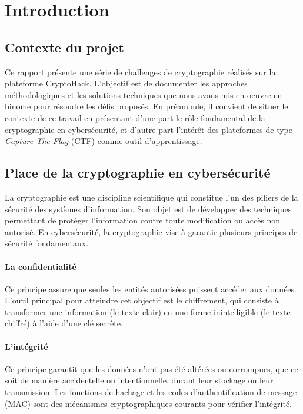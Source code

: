 \section{Introduction}

\subsection{Contexte du projet}
Ce rapport présente une série de challenges de cryptographie réalisés sur la
plateforme CryptoHack. L'objectif est de documenter les approches
méthodologiques et les solutions techniques que nous avons mis en oeuvre en
binome pour résoudre les défis proposés. En préambule, il convient de situer
le contexte de ce travail en présentant d'une part le rôle fondamental de la
cryptographie en cybersécurité, et d'autre part l'intérêt des plateformes de
type \textit{Capture The Flag} (CTF) comme outil d'apprentissage.

\subsection{Place de la cryptographie en cybersécurité}
La cryptographie est une discipline scientifique qui constitue l'un des
piliers de la sécurité des systèmes d'information. Son objet est de
développer des techniques permettant de protéger l'information contre toute
modification ou accès non autorisé. En cybersécurité, la cryptographie vise
à garantir plusieurs principes de sécurité fondamentaux.

\paragraph{La confidentialité}
Ce principe assure que seules les entités autorisées puissent accéder aux
données. L'outil principal pour atteindre cet objectif est le chiffrement,
qui consiste à transformer une information (le texte clair) en une forme
inintelligible (le texte chiffré) à l'aide d'une clé secrète.

\paragraph{L'intégrité}
Ce principe garantit que les données n'ont pas été altérées ou corrompues,
que ce soit de manière accidentelle ou intentionnelle, durant leur stockage
ou leur transmission. Les fonctions de hachage et les codes
d'authentification de message (MAC) sont des mécanismes cryptographiques
courants pour vérifier l'intégrité.

